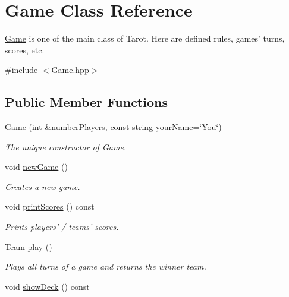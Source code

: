\hypertarget{classGame}{\section{\-Game \-Class \-Reference}
\label{classGame}
}


\hyperlink{classGame}{\-Game} is one of the main class of \-Tarot. \-Here are defined rules, games' turns, scores, etc.  




{\ttfamily \#include $<$\-Game.\-hpp$>$}

\subsection*{\-Public \-Member \-Functions}
\begin{DoxyCompactItemize}
\item 
\hyperlink{classGame_ad800214017e2813ed0dc77d95d5766aa}{\-Game} (int \&number\-Players, const string your\-Name=\char`\"{}\-You\char`\"{})
\begin{DoxyCompactList}\small\item\em \-The unique constructor of \hyperlink{classGame}{\-Game}. \end{DoxyCompactList}\item 
\hypertarget{classGame_a12f32ba70a35a0dcd1f527b4d4a0d2c4}{void \hyperlink{classGame_a12f32ba70a35a0dcd1f527b4d4a0d2c4}{new\-Game} ()}\label{classGame_a12f32ba70a35a0dcd1f527b4d4a0d2c4}

\begin{DoxyCompactList}\small\item\em \-Creates a new game. \end{DoxyCompactList}\item 
\hypertarget{classGame_acb39f55a7b0b1d0d35b06d305a508dd4}{void \hyperlink{classGame_acb39f55a7b0b1d0d35b06d305a508dd4}{print\-Scores} () const }\label{classGame_acb39f55a7b0b1d0d35b06d305a508dd4}

\begin{DoxyCompactList}\small\item\em \-Prints players' / teams' scores. \end{DoxyCompactList}\item 
\hypertarget{classGame_a6a76e181e24425eb361960d5b5d184bd}{\hyperlink{classTeam}{\-Team} \hyperlink{classGame_a6a76e181e24425eb361960d5b5d184bd}{play} ()}\label{classGame_a6a76e181e24425eb361960d5b5d184bd}

\begin{DoxyCompactList}\small\item\em \-Plays all turns of a game and returns the winner team. \end{DoxyCompactList}\item 
\hypertarget{classGame_a1e9e48c10a9ca4bc66b69e05b983e3ab}{void \hyperlink{classGame_a1e9e48c10a9ca4bc66b69e05b983e3ab}{show\-Deck} () const }\label{classGame_a1e9e48c10a9ca4bc66b69e05b983e3ab}


\end{DoxyCompactItemize}
